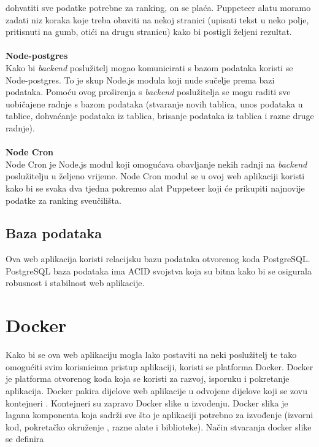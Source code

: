 \documentclass[times, utf8, zavrsni]{fer}
\begin{document}
dohvatiti sve podatke potrebne za ranking, on se plaća. Puppeteer alatu moramo zadati niz koraka koje treba obaviti na nekoj stranici (upisati tekst u neko polje, pritisnuti na gumb, otići na drugu stranicu)
kako bi postigli željeni rezultat.
\\ \\ \textbf{Node-postgres} 
\\ Kako bi \emph{backend} poslužitelj mogao komunicirati s bazom podataka koristi se Node-postgres. To je skup Node.js modula koji nude 
sučelje prema bazi podataka. Pomoću ovog proširenja s \emph{backend} poslužitelja se mogu raditi sve uobičajene radnje s bazom podataka (stvaranje novih tablica, 
unos podataka u tablice, dohvaćanje podataka iz tablica, brisanje podataka iz tablica i razne druge radnje).
\\ \\ \textbf{Node Cron}
\\ Node Cron je Node.js modul koji omogućava obavljanje nekih radnji na \emph{backend} poslužitelju u željeno vrijeme. Node Cron modul se u ovoj 
web aplikaciji koristi kako bi se svaka dva tjedna pokrenuo alat Puppeteer koji će prikupiti najnovije podatke za ranking sveučilišta.
\\ \subsection{Baza podataka}Ova web aplikacija koristi relacijsku bazu podataka otvorenog koda PostgreSQL. \\PostgreSQL baza podataka ima ACID 
 svojstva koja su bitna kako bi se osigurala robusnost i stabilnost web aplikacije.
\\ \section{Docker}
Kako bi se ova web aplikaciju mogla lako postaviti  na neki poslužitelj te tako omogućiti svim korisnicima pristup aplikaciji,
koristi se platforma Docker. Docker je platforma otvorenog koda koja se koristi za razvoj, isporuku i pokretanje aplikacija.
Docker pakira dijelove web aplikacije u odvojene dijelove koji se zovu kontejneri .
Kontejneri su zapravo Docker slike  u izvođenju. Docker slika je lagana  komponenta koja sadrži sve što je aplikaciji 
potrebno za izvođenje (izvorni kod, pokretačko okruženje , razne alate i biblioteke). Način stvaranja docker slike se definira 
\end{document}
